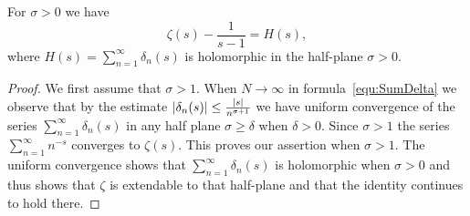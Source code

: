 \begin{corollary}\label{cor:ZetaCont}
	For $\sigma > 0$ we have
\begin{equation*}
	\zeta(s) - \frac{1}{s - 1} = H(s),
\end{equation*}
	where $H(s) = \sum _{n = 1} ^\infty \delta_n(s)$ is holomorphic in the half-plane $\sigma > 0$. 
\end{corollary}
\begin{proof}
	We first assume that $\sigma > 1$. When $N \to \infty$ in formula~\ref{equ:SumDelta} we observe that by the estimate $\left|\delta_n(s)\right| \leq \frac{\left|s\right|}{n^{\sigma + 1}}$ we have uniform convergence of the series $\sum _{n = 1} ^\infty \delta_n(s)$ in any half plane $\sigma \geq \delta$ when $\delta > 0$. Since $\sigma > 1$ the series $\sum _{n = 1} ^{\infty} n^{-s}$ converges to $\zeta(s)$. This proves our assertion when $\sigma > 1$. The uniform convergence shows that $\sum _{n = 1} ^\infty \delta_n(s)$ is holomorphic when $\sigma > 0$ and thus shows that $\zeta$ is extendable to that half-plane and that the identity continues to hold there.
\end{proof}


